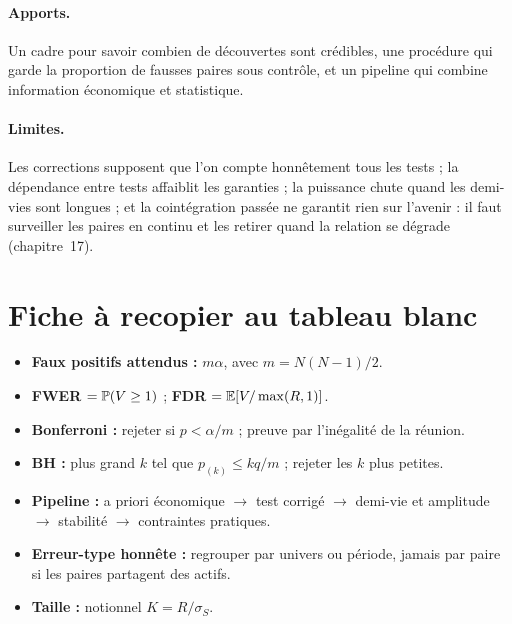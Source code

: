 \paragraph{Apports.} Un cadre pour savoir combien de découvertes sont crédibles, une procédure qui garde la proportion de fausses paires sous contrôle, et un pipeline qui combine information économique et statistique.

\paragraph{Limites.} Les corrections supposent que l'on compte honnêtement tous les tests ; la dépendance entre tests affaiblit les garanties ; la puissance chute quand les demi-vies sont longues ; et la cointégration passée ne garantit rien sur l'avenir : il faut surveiller les paires en continu et les retirer quand la relation se dégrade (chapitre~17).

\section{Fiche à recopier au tableau blanc}

\begin{whiteboard}
\begin{itemize}[leftmargin=1.2em]
\item \textbf{Faux positifs attendus :} $m\alpha$, avec $m = N(N-1)/2$.
\item \textbf{FWER} $=\mathbb{P}(V\ge1)$ ; \textbf{FDR} $=\mathbb{E}[V/\max(R,1)]$.
\item \textbf{Bonferroni :} rejeter si $p < \alpha/m$ ; preuve par l'inégalité de la réunion.
\item \textbf{BH :} plus grand $k$ tel que $p_{(k)}\le kq/m$ ; rejeter les $k$ plus petites.
\item \textbf{Pipeline :} a priori économique $\to$ test corrigé $\to$ demi-vie et amplitude $\to$ stabilité $\to$ contraintes pratiques.
\item \textbf{Erreur-type honnête :} regrouper par univers ou période, jamais par paire si les paires partagent des actifs.
\item \textbf{Taille :} notionnel $K = R/\sigma_S$.
\end{itemize}
\end{whiteboard}

